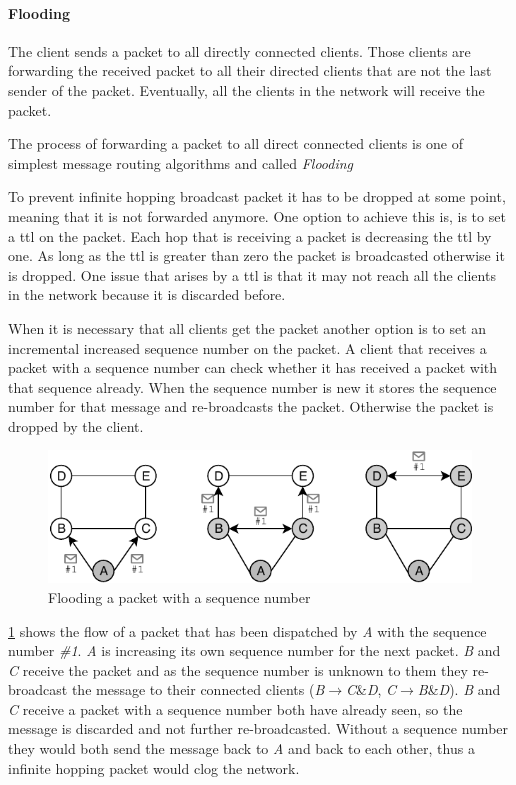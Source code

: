 \paragraph{Flooding}\label{flooding}
The client sends a packet to all directly connected clients. Those clients are forwarding the received packet to all their directed clients that are not the last sender of the packet. Eventually, all the clients in the network will receive the packet. 

The process of forwarding a packet to all direct connected clients is one of simplest message routing algorithms and called \textit{Flooding} \cite[p. 368]{tanenbaum_wetherall_2011}

To prevent infinite hopping broadcast packet it has to be dropped at some point, meaning that it is not forwarded anymore.
One option to achieve this is, is to set a \gls{ttl} on the packet. Each hop that is receiving a packet is decreasing the \gls{ttl} by one. As long as the \gls{ttl} is greater than zero the packet is broadcasted otherwise it is dropped. One issue that arises by a \gls{ttl} is that it may not reach all the clients in the network because it is discarded before.

When it is necessary that all clients get the packet another option is to set an incremental increased sequence number on the packet.
A client that receives a packet with a sequence number can check whether it has received a packet with that sequence already. When the sequence number is new it stores the sequence number for that message and re-broadcasts the packet. Otherwise the packet is dropped by the client.

\begin{figure}
\centering
\includegraphics[width=1\textwidth]{graphics/flooding-with-sequence.pdf}
\caption{Flooding a packet with a sequence number}
\label{fig:flooding}
\end{figure}

\cref{fig:flooding} shows the flow of a packet that has been dispatched by \textit{A} with the sequence number \textit{\#1}. \textit{A} is increasing its own sequence number for the next packet. \textit{B} and \textit{C} receive the packet and as the sequence number is unknown to them they re-broadcast the message to their connected clients (\textit{B}$\rightarrow$\textit{C}\&\textit{D},  \textit{C}$\rightarrow$\textit{B}\&\textit{D}). \textit{B} and \textit{C} receive a packet with a sequence number both have already seen, so the message is discarded and not further re-broadcasted. Without a sequence number they would both send the message back to \textit{A} and back to each other, thus a infinite hopping packet would clog the network.

